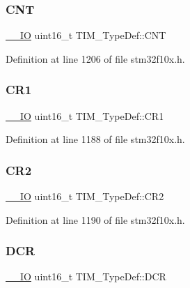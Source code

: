 \subsubsection{\texorpdfstring{C\+NT}{CNT}}
{\footnotesize\ttfamily \hyperlink{core__sc300_8h_aec43007d9998a0a0e01faede4133d6be}{\+\_\+\+\_\+\+IO} uint16\+\_\+t T\+I\+M\+\_\+\+Type\+Def\+::\+C\+NT}



Definition at line 1206 of file stm32f10x.\+h.

\mbox{\label{struct_t_i_m___type_def_a410988826004fdd21d55071215144ba9}} 
\subsubsection{\texorpdfstring{C\+R1}{CR1}}
{\footnotesize\ttfamily \hyperlink{core__sc300_8h_aec43007d9998a0a0e01faede4133d6be}{\+\_\+\+\_\+\+IO} uint16\+\_\+t T\+I\+M\+\_\+\+Type\+Def\+::\+C\+R1}



Definition at line 1188 of file stm32f10x.\+h.

\mbox{\label{struct_t_i_m___type_def_a954eb69fd4e2e6b43ba6c80986f691d8}} 
\subsubsection{\texorpdfstring{C\+R2}{CR2}}
{\footnotesize\ttfamily \hyperlink{core__sc300_8h_aec43007d9998a0a0e01faede4133d6be}{\+\_\+\+\_\+\+IO} uint16\+\_\+t T\+I\+M\+\_\+\+Type\+Def\+::\+C\+R2}



Definition at line 1190 of file stm32f10x.\+h.

\mbox{\label{struct_t_i_m___type_def_ad3186a43824621f049e7eff37c88ad4e}} 
\subsubsection{\texorpdfstring{D\+CR}{DCR}}
{\footnotesize\ttfamily \hyperlink{core__sc300_8h_aec43007d9998a0a0e01faede4133d6be}{\+\_\+\+\_\+\+IO} uint16\+\_\+t T\+I\+M\+\_\+\+Type\+Def\+::\+D\+CR}




